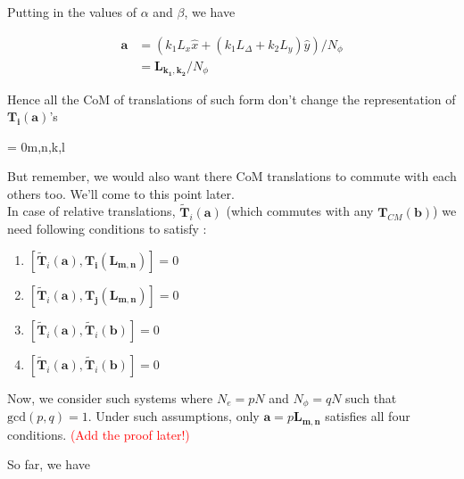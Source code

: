 \documentclass[11pt,a4paper,notitlepage]{article}
\newcommand{\bsym}{\boldsymbol}
\newcommand{\non}{\nonumber}
\newcommand{\cbrak}[1]{\left( #1 \right)}
\newcommand{\np}{N_{\phi}}
\newcommand{\ti}[2]{\bsym{T_{#1}}(\bsym{#2})}
\newcommand{\tcm}[1]{\bsym{T}_{CM}(\bsym{#1})}
\newcommand{\tcmnp}[1]{\bsym{T}_{CM}(\bsym{#1}/\np)}
\newcommand{\trel}[2]{\tilde{\bsym{T}}_{#1}(\bsym{#2})}
\begin{document}
                Putting in the values of $\alpha$ and $\beta$, we have

                \begin{align}
                  \bsym{a} &=\cbrak{k_{1}L_{x}\hat{x} + (k_1L_{\Delta}+k_2L_{y})\hat{y}}/\np \non \\
                  & = \bsym{L_{k_1,k_2}}/\np \non
                \end{align}

                Hence all the CoM of translations of such form don't change the representation of $\ti{i}{a}$'s

                \begin{tcolorbox}
                  \implies [\tcmnp{L_{m,n}},\ti{i}{L_{k,l}}] = 0\quad m,n,k,l\in{}
                \end{tcolorbox}

                But remember, we would also want there CoM translations to commute with each others too. We'll come to this point later.\\

                In case of relative translations, $\trel{i}{a}$ (which commutes with any $\tcm{b}$) we need following conditions to satisfy :

                \begin{enumerate}
                \item $[\trel{i}{a},\ti{i}{L_{m,n}}]  = 0$
                \item $[\trel{i}{a},\ti{j}{L_{m,n}}]  = 0$
                \item $[\trel{i}{a},\trel{i}{b}]  = 0$
                \item $[\trel{i}{a},\trel{i}{b}]  = 0$
                \end{enumerate}

                Now, we consider such systems where $N_{e}=pN$ and $\np = qN$ such that $\text{gcd}(p,q)=1$. Under such assumptions, only $\bsym{a} = p\bsym{L_{m,n}}$
                satisfies all four conditions. \textcolor{red}{(Add the proof later!)}

                So far, we have
\end{document}
